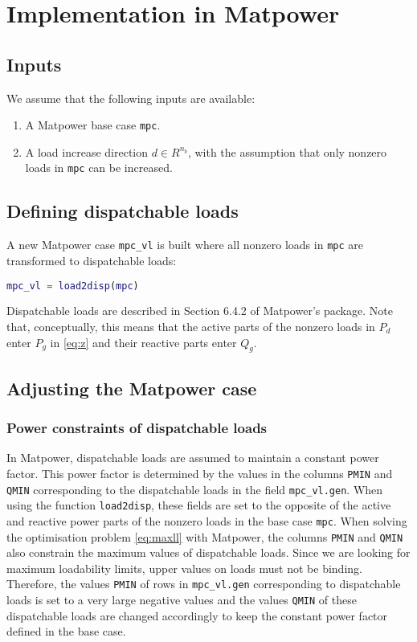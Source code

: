 \documentclass[12pt,a4]{article}
\newcommand*{\codemat}[1]{\texttt{#1}}
\newcommand*{\matpower}{{\sc Matpower}}
\begin{document}
\section{Implementation in \matpower{}}
\label{sec:impl-matp}

\subsection{Inputs}
\label{sec:inputs}

We assume that the following inputs are available:
\begin{enumerate}
\item A \matpower{} base case \codemat{mpc}.
\item A load increase direction $d \in R^{n_b}$, with the assumption that only nonzero loads in \codemat{mpc} can be increased.
\end{enumerate}

\subsection{Defining dispatchable loads}
\label{sec:defin-disp-loads}

A new \matpower{} case \codemat{mpc\_vl} is built where all nonzero loads in \codemat{mpc} are transformed to dispatchable loads:
\begin{lstlisting}[language=Matlab]
mpc_vl = load2disp(mpc)  
\end{lstlisting}
Dispatchable loads are described in Section 6.4.2 of \matpower{}'s package.
Note that, conceptually, this means that the active parts of the nonzero loads in $P_d$ enter $P_g$ in \eqref{eq:z} and their reactive parts enter $Q_g$.

\subsection{Adjusting the \matpower{} case}
\label{sec:adjust-matp-case}

\subsubsection{Power constraints of dispatchable loads}
\label{sec:limits-disp-loads}

In \matpower{}, dispatchable loads are assumed to maintain a constant power factor. 
This power factor is determined by the values in the columns \codemat{PMIN} and \codemat{QMIN} corresponding to the dispatchable loads in the field \codemat{mpc\_vl.gen}.
When using the function \codemat{load2disp}, these fields are set to the opposite of the active and reactive power parts of the nonzero loads in the base case \codemat{mpc}.
When solving the optimisation problem \eqref{eq:maxll} with \matpower{}, the columns \codemat{PMIN} and \codemat{QMIN} also constrain the maximum values of dispatchable loads.
Since we are looking for maximum loadability limits, upper values on loads must not be binding.
Therefore, the values \codemat{PMIN} of rows in \codemat{mpc\_vl.gen} corresponding to dispatchable loads is set to a very large negative values and the values \codemat{QMIN} of these dispatchable loads are changed accordingly to keep the constant power factor defined in the base case.
\end{document}
